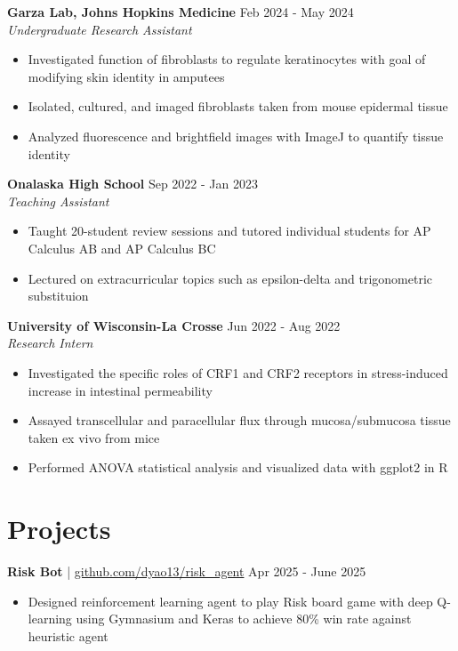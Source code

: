 \documentclass[11pt]{article}       %
\begin{document}
\textbf{Garza Lab, Johns Hopkins Medicine} \hfill Feb 2024 - May 2024 \\
\textit{Undergraduate Research Assistant} \vspace{-9pt} \\
\begin{itemize}
  \item Investigated function of fibroblasts to regulate keratinocytes with goal of modifying skin identity in amputees
  \item Isolated, cultured, and imaged fibroblasts taken from mouse epidermal tissue
  \item Analyzed fluorescence and brightfield images with ImageJ to quantify tissue identity
\end{itemize}

\textbf{Onalaska High School} \hfill Sep 2022 - Jan 2023 \\
\textit{Teaching Assistant} \vspace{-9pt} \\
\begin{itemize}
  \item Taught 20-student review sessions and tutored individual students for AP Calculus AB and AP Calculus BC
  \item Lectured on extracurricular topics such as epsilon-delta and trigonometric substituion
\end{itemize}

\textbf{University of Wisconsin-La Crosse} \hfill Jun 2022 - Aug 2022 \\
\textit{Research Intern} \vspace{-9pt} \\
\begin{itemize}
  \item Investigated the specific roles of CRF1 and CRF2 receptors in stress-induced increase in intestinal permeability
  \item Assayed transcellular and paracellular flux through mucosa/submucosa tissue taken ex vivo from mice
  \item Performed ANOVA statistical analysis and visualized data with ggplot2 in R
\end{itemize}

\vspace{-18.5pt}

\section*{Projects}
\textbf{Risk Bot} | \href{https://github.com/dyao13/risk_agent}{github.com/dyao13/risk\_agent} \hfill Apr 2025 - June 2025 \vspace{-9pt} \\
\begin{itemize}
  \item Designed reinforcement learning agent to play Risk board game with deep Q-learning using Gymnasium and Keras to achieve 80\% win rate against heuristic agent
\end{itemize}
\end{document}
